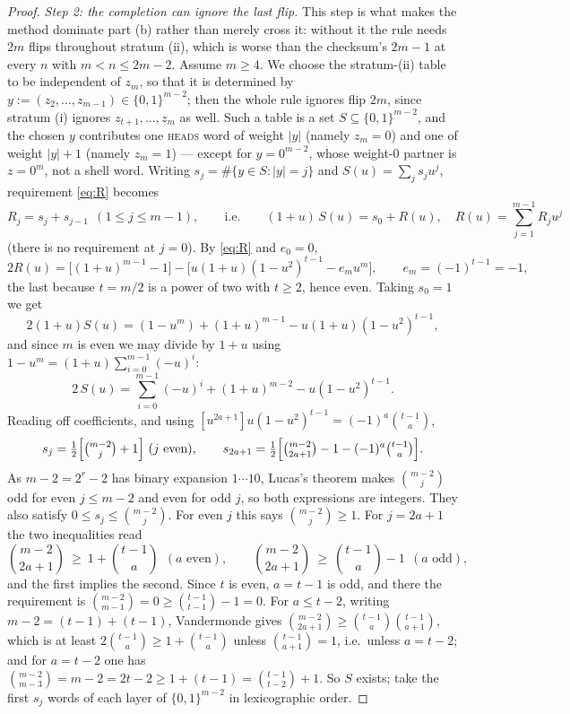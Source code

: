 \documentclass[11pt]{article}
\theoremstyle{remark}
\newcommand{\head}{\textnormal{\textsc{heads}}}
\begin{document}
\begin{proof}
\emph{Step 2: the completion can ignore the last flip.} This step is what
makes the method dominate part (b) rather than merely cross it: without it
the rule needs $2m$ flips throughout stratum (ii), which is worse than the
checksum's $2m-1$ at every $n$ with $m<n\le2m-2$. Assume $m\ge4$. We
choose the stratum-(ii) table to be independent of $z_m$, so that it is
determined by $y:=(z_2,\dots,z_{m-1})\in\{0,1\}^{m-2}$; then the whole rule
ignores flip $2m$, since stratum (i) ignores $z_{t+1},\dots,z_m$ as well.
Such a table is a set $S\subseteq\{0,1\}^{m-2}$, and the chosen $y$
contributes one \head{} word of weight $|y|$ (namely $z_m=0$) and one of
weight $|y|+1$ (namely $z_m=1$) --- except for $y=0^{m-2}$, whose weight-$0$
partner is $z=0^m$, not a shell word. Writing $s_j=\#\{y\in S:|y|=j\}$ and
$S(u)=\sum_j s_ju^j$, requirement \eqref{eq:R} becomes
\[
R_j=s_j+s_{j-1}\ \ (1\le j\le m-1),
\qquad\text{i.e.}\qquad
(1+u)\,S(u)=s_0+R(u),\quad R(u)=\sum_{j=1}^{m-1}R_ju^j
\]
(there is no requirement at $j=0$). By \eqref{eq:R} and $e_0=0$,
\[
2R(u)=\bigl[(1+u)^{m-1}-1\bigr]-\bigl[u(1+u)(1-u^2)^{t-1}-e_mu^m\bigr],
\qquad e_m=(-1)^{t-1}=-1 ,
\]
the last because $t=m/2$ is a power of two with $t\ge2$, hence even. Taking
$s_0=1$ we get
\[
2(1+u)S(u)=(1-u^{m})+(1+u)^{m-1}-u(1+u)(1-u^2)^{t-1} ,
\]
and since $m$ is even we may divide by
$1+u$ using $1-u^m=(1+u)\sum_{i=0}^{m-1}(-u)^i$:
\begin{equation}\label{eq:S}
2\,S(u)=\sum_{i=0}^{m-1}(-u)^i+(1+u)^{m-2}-u(1-u^2)^{t-1} .
\end{equation}
Reading off coefficients, and using $[u^{2a+1}]u(1-u^2)^{t-1}=(-1)^a\binom{t-1}a$,
\[
s_j=\tfrac12\Bigl[\tbinom{m-2}{j}+1\Bigr]\ (j \text{ even}),
\qquad
s_{2a+1}=\tfrac12\Bigl[\tbinom{m-2}{2a+1}-1-(-1)^a\tbinom{t-1}a\Bigr].
\]
As $m-2=2^r-2$ has binary expansion $1\cdots10$, Lucas's theorem makes
$\binom{m-2}j$ odd for even $j\le m-2$ and even for odd $j$, so both
expressions are integers. They also satisfy $0\le s_j\le\binom{m-2}j$. For
even $j$ this says $\binom{m-2}j\ge1$. For $j=2a+1$ the two inequalities read
\[
\binom{m-2}{2a+1}\ \ge\ 1+\binom{t-1}a \ \ (a \text{ even}),
\qquad
\binom{m-2}{2a+1}\ \ge\ \binom{t-1}a-1 \ \ (a \text{ odd}),
\]
and the first implies the second. Since $t$ is even, $a=t-1$ is odd, and
there the requirement is $\binom{m-2}{m-1}=0\ge\binom{t-1}{t-1}-1=0$. For
$a\le t-2$, writing $m-2=(t-1)+(t-1)$, Vandermonde gives
$\binom{m-2}{2a+1}\ge\binom{t-1}a\binom{t-1}{a+1}$, which is at least
$2\binom{t-1}a\ge1+\binom{t-1}a$ unless $\binom{t-1}{a+1}=1$, i.e.\ unless
$a=t-2$; and for $a=t-2$ one has
$\binom{m-2}{m-3}=m-2=2t-2\ge1+(t-1)=\binom{t-1}{t-2}+1$. So $S$ exists;
take the first $s_j$ words of each layer of $\{0,1\}^{m-2}$ in lexicographic
order.


\end{proof}
\end{document}
